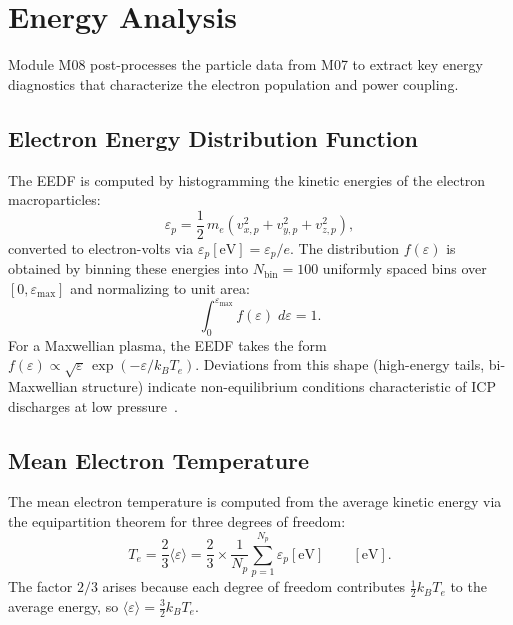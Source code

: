 \documentclass[11pt,a4paper]{report}
\begin{document}
\section{Energy Analysis}
\label{sec:m08}

Module M08 post-processes the particle data from M07 to extract key energy diagnostics that characterize the electron population and power coupling.

\subsection{Electron Energy Distribution Function}

The EEDF is computed by histogramming the kinetic energies of the electron macroparticles:
\begin{equation}
  \varepsilon_p = \frac{1}{2}\,m_e\!\left(v_{x,p}^2 + v_{y,p}^2 + v_{z,p}^2\right),
  \label{eq:eedf-energy}
\end{equation}
converted to electron-volts via $\varepsilon_p[\mathrm{eV}] = \varepsilon_p / e$.  The distribution $f(\varepsilon)$ is obtained by binning these energies into $N_\mathrm{bin} = 100$ uniformly spaced bins over $[0, \varepsilon_\mathrm{max}]$ and normalizing to unit area:
\begin{equation}
  \int_0^{\varepsilon_\mathrm{max}} f(\varepsilon)\;d\varepsilon = 1.
  \label{eq:eedf-norm}
\end{equation}
For a Maxwellian plasma, the EEDF takes the form $f(\varepsilon) \propto \sqrt{\varepsilon}\,\exp(-\varepsilon / k_B T_e)$.  Deviations from this shape (high-energy tails, bi-Maxwellian structure) indicate non-equilibrium conditions characteristic of ICP discharges at low pressure~\cite{Lieberman2005}.

\subsection{Mean Electron Temperature}

The mean electron temperature is computed from the average kinetic energy via the equipartition theorem for three degrees of freedom:
\begin{equation}
  T_e = \frac{2}{3}\langle\varepsilon\rangle
      = \frac{2}{3} \times \frac{1}{N_p}\sum_{p=1}^{N_p} \varepsilon_p[\mathrm{eV}]
  \qquad [\mathrm{eV}].
  \label{eq:m08-te}
\end{equation}
The factor $2/3$ arises because each degree of freedom contributes $\frac{1}{2} k_B T_e$ to the average energy, so $\langle\varepsilon\rangle = \frac{3}{2} k_B T_e$.
\end{document}
